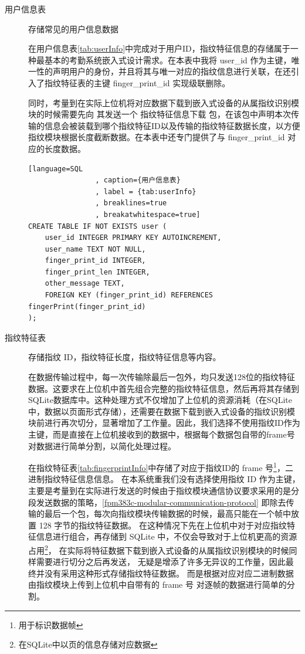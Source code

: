     \begin{description}
        \item[用户信息表] 存储常见的用户信息数据

            在用户信息表\ref{tab:userInfo}中完成对于用户ID，指纹特征信息的存储属于一种最基本的考勤系统嵌入式设计需求。在本表中我将 user\_id 作为主键，唯一性的声明用户的身份，并且将其与唯一对应的指纹信息进行关联，在还引入了指纹特征表的主键 finger\_print\_id 实现级联删除。

            同时，考量到在实际上位机将对应数据下载到嵌入式设备的从属指纹识别模块的时候需要先向
            其发送一个 指纹特征信息下载 包，在该包中声明本次传输的信息会被装载到哪个指纹特征ID以及传输的指纹特征数据长度，以方便指纹模块根据长度截断数据。在本表中还专门提供了与
            finger\_print\_id 对应的长度数据。

            \begin{lstlisting}[language=SQL
                , caption={用户信息表}
                , label = {tab:userInfo}
                , breaklines=true
                , breakatwhitespace=true]
CREATE TABLE IF NOT EXISTS user (
    user_id INTEGER PRIMARY KEY AUTOINCREMENT,
    user_name TEXT NOT NULL,
    finger_print_id INTEGER,
    finger_print_len INTEGER,
    other_message TEXT,
    FOREIGN KEY (finger_print_id) REFERENCES fingerPrint(finger_print_id)
);
            \end{lstlisting}

        \item[指纹特征表] 存储指纹 ID，指纹特征长度，指纹特征信息等内容。
        
            在数据传输过程中，每一次传输除最后一包外，均只发送128位的指纹特征数据。这要求在上位机中首先组合完整的指纹特征信息，然后再将其存储到SQLite数据库中。这种处理方式不仅增加了上位机的资源消耗（在SQLite中，数据以页面形式存储），还需要在数据下载到嵌入式设备的指纹识别模块前进行再次切分，显著增加了工作量。因此，我们选择不使用指纹ID作为主键，而是直接在上位机接收到的数据中，根据每个数据包自带的frame号对数据进行简单分割，以简化处理过程。
        
            在指纹特征表\ref{tab:fingerprintInfo}中存储了对应于指纹ID的 frame 号\footnote{用于标识数据帧}，二进制指纹特征信息信息。
            在本系统重我们没有选择使用指纹 ID 作为主键，主要是考量到在实际进行发送的时候由于指纹模块通信协议要求采用的是分段发送数据的策略，\ref{fpm383c-modular-communication-protocol}
            即除去传输的最后一个包，每次向指纹模块传输数据的时候，最高只能在一个帧中放置 128 字节的指纹特征数据。
            在这种情况下先在上位机中对于对应指纹特征信息进行组合，再存储到 SQLite 中，不仅会导致对于上位机更高的资源占用\footnote{在SQLite中以页的信息存储对应数据}，
            在实际将特征数据下载到嵌入式设备的从属指纹识别模块的时候同样需要进行切分之后再发送，
            无疑是增添了许多无异议的工作量，因此最终并没有采用这种形式存储指纹特征数据。
            而是根据对应对应二进制数据由指纹模块上传到上位机中自带有的 frame 号 对逐帧的数据进行简单的分割。


\end{description}
